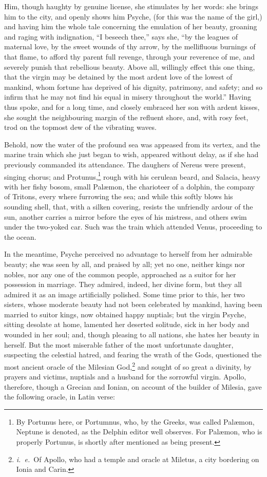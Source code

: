\documentclass{article}
\begin{document}
Him, though haughty by genuine license, she stimulates by her words: she brings
him to the city, and openly shows him Psyche, (for this was the name of the
girl,) and having him the whole tale concerning the emulation of her beauty,
groaning and raging with indignation, ``I beseech thee,'' says she, ``by the
leagues of maternal love, by the sweet wounds of thy arrow, by the mellifluous
burnings of that flame, to afford thy parent full revenge, through your
reverence of me, and severely punish that rebellious beauty. Above all,
willingly effect this one thing, that the virgin may be detained by the most
ardent love of the lowest of mankind, whom fortune has deprived of his dignity,
patrimony, and safety; and so infirm that he may not find his equal in misery
throughout the world.'' Having thus spoke, and for a long time, and closely
embraced her son with ardent kisses, she sought the neighbouring margin of the
refluent shore, and, with rosy feet, trod on the topmost dew of the vibrating
waves.

Behold, now the water of the profound sea was appeased from its vertex, and the
marine train which she just began to wish, appeared without delay, as if she
had previously commanded its attendance. The daughers of Nereus were present,
singing chorus; and Protunus,\footnote{By Portunus here, or Portumnus, who, by
the Greeks, was called Pal{\ae}mon, Neptune is denoted, as the Delphin editor
well observes. For Pal{\ae}mon, who is properly Portunus, is shortly after
mentioned as being present.} rough with his cerulean beard, and Salacia, heavy
with her fishy bosom, small Pal{\ae}mon, the charioteer of a dolphin, the
company of Tritons, every where furrowing the sea; and while this softly blows
his sounding shell, that, with a silken covering, resists the unfriendly ardour
of the sun, another carries a mirror before the eyes of his mistress, and
others swim under the two-yoked car. Such was the train which attended Venus,
proceeding to the ocean.

In the meantime, Psyche perceived no advantage to herself from her admirable
beauty; she was seen by all, and praised by all; yet no one, neither kings nor
nobles, nor any one of the common people, approached as a suitor for her
possession in marriage. They admired, indeed, her divine form, but they all
admired it as an image artificially polished. Some time prior to this, her two
sisters, whose moderate beauty had not been celebrated by mankind, having been
married to suitor kings, now obtained happy nuptials; but the virgin Psyche,
sitting desolate at home, lamented her deserted solitude, sick in her body and
wounded in her soul; and, though pleasing to all nations, she hates her beauty
in herself. But the most miserable father of the most unfortunate daughter,
suspecting the celestial hatred, and fearing the wrath of the Gods, questioned
the most ancient oracle of the Milesian God,\footnote{\textit{i.~e.}~Of Apollo,
who had a temple and oracle at Miletus, a city bordering on Ionia and Carin.}
and sought of so great a divinity, by prayers and victims, nuptials and a
husband for the sorrowful virgin. Apollo, therefore, though a Grecian and
Ionian, on account of the builder of Milesia, gave the following oracle, in
Latin verse:
\end{document}
